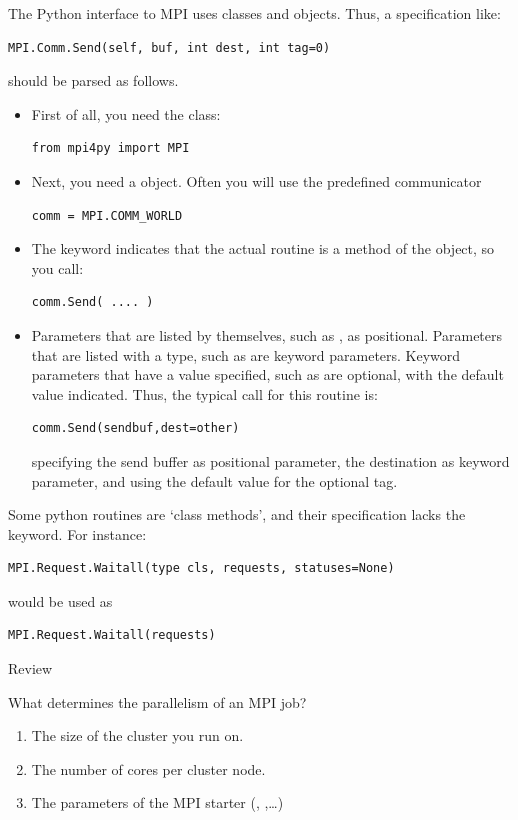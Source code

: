 The Python interface to MPI uses classes and objects. Thus, a
specification like:
\lstset{language=Python} %
\begin{lstlisting}
MPI.Comm.Send(self, buf, int dest, int tag=0)
\end{lstlisting}
should be parsed as follows.
\begin{itemize}
\item First of all, you need the  class:
\begin{lstlisting}
from mpi4py import MPI
\end{lstlisting}
\item Next, you need a  object. Often you will use the
  predefined communicator
\begin{lstlisting}
comm = MPI.COMM_WORLD
\end{lstlisting}
\item The keyword  indicates that the actual routine 
  is a method of the  object, so you call:
\begin{lstlisting}
comm.Send( .... )
\end{lstlisting}
\item Parameters that are listed by themselves, such as , as
  positional. Parameters that are listed with a type, such as  are keyword parameters. Keyword parameters that have a value
  specified, such as  are optional, with the default
  value indicated. Thus, the typical call for this routine is:
\begin{lstlisting}
comm.Send(sendbuf,dest=other)
\end{lstlisting}
  specifying the send buffer as positional parameter, the destination
  as keyword parameter, and using the default value for the optional tag.
\end{itemize}
Some python routines are `class methods', and their specification
lacks the  keyword. For instance:
\begin{lstlisting}
MPI.Request.Waitall(type cls, requests, statuses=None)
\end{lstlisting}
would be used as
\begin{lstlisting}
MPI.Request.Waitall(requests)
\end{lstlisting}
\lstset{language=C} %

 {Review}

\begin{review}
  What determines the parallelism of an MPI job?
  \begin{enumerate}
  \item The size of the cluster you run on.
  \item The number of cores per cluster node.
  \item\label{it:ans:mpiexec} The parameters of the MPI starter (,
    ,\ldots)
  \end{enumerate}
\end{review}

